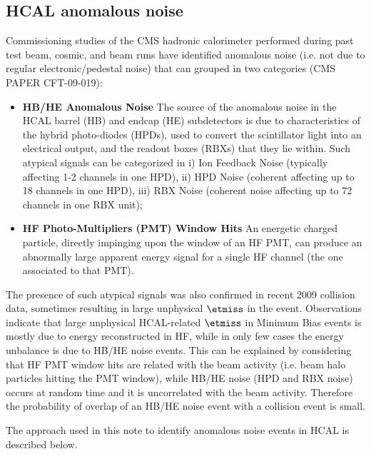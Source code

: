 \subsection{HCAL anomalous noise}
Commissioning studies of the CMS hadronic calorimeter performed 
during past test beam, cosmic, and beam runs have 
identified anomalous noise (i.e. not due to regular 
electronic/pedestal noise) that can grouped in two categories 
(CMS PAPER CFT-09-019):
\begin{itemize}
\item{\bf HB/HE Anomalous Noise} The source of the anomalous noise in the HCAL 
barrel (HB) and endcap (HE) subdetectors is due to characteristics 
of the hybrid photo-diodes (HPDs), used to convert the scintillator light into 
an electrical output, and the readout boxes (RBXs) that they lie within.
Such atypical signals can be categorized 
in i) Ion Feedback Noise (typically affecting 1-2 channels in one HPD), ii) HPD Noise 
(coherent affecting up to 18 channels in one HPD), iii) RBX Noise 
(coherent noise affecting up to 72 channels in one RBX unit);
\item{\bf HF Photo-Multipliers (PMT) Window Hits} An energetic charged particle, directly 
impinging upon the window of an HF PMT, can produce an abnormally large apparent 
energy signal for a single HF channel (the one associated to that PMT). 
\end{itemize}

The presence of such atypical signals was also confirmed in recent 
2009 collision data, sometimes resulting in large unphysical $\etmiss$ in the event. 
Observations indicate that large unphysical HCAL-related $\etmiss$ 
in Minimum Bias events is mostly due to energy reconstructed in HF, 
while in only few cases the energy unbalance is due to HB/HE noise events. 
This can be explained by considering that HF PMT window hits 
are related with the beam activity (i.e. beam halo particles hitting the PMT window), 
while HB/HE noise (HPD and RBX noise) occurs at random time and it is 
uncorrelated with the beam activity. Therefore the probability of overlap 
of an HB/HE noise event with a collision event is small.

The approach used in this note to identify anomalous noise events in HCAL is described below.

